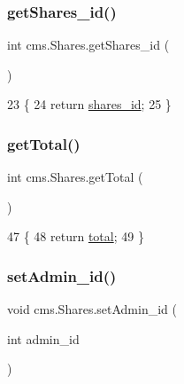 \subsubsection{\texorpdfstring{get\+Shares\+\_\+id()}{getShares\_id()}}
{\footnotesize\ttfamily int cms.\+Shares.\+get\+Shares\+\_\+id (\begin{DoxyParamCaption}{ }\end{DoxyParamCaption})\hspace{0.3cm}{\ttfamily [inline]}}


\begin{DoxyCode}
23                               \{
24         \textcolor{keywordflow}{return} \mbox{\hyperlink{classcms_1_1_shares_a15e43f7e31f2c147893fc92c4a94037a}{shares\_id}};
25     \}
\end{DoxyCode}
\mbox{\label{classcms_1_1_shares_a7c570e186e607ad6e777d7882259e91f}} 
\subsubsection{\texorpdfstring{get\+Total()}{getTotal()}}
{\footnotesize\ttfamily int cms.\+Shares.\+get\+Total (\begin{DoxyParamCaption}{ }\end{DoxyParamCaption})\hspace{0.3cm}{\ttfamily [inline]}}


\begin{DoxyCode}
47                           \{
48         \textcolor{keywordflow}{return} \mbox{\hyperlink{classcms_1_1_shares_ab40a204e3f87bf0f315888a9040a8681}{total}};
49     \}
\end{DoxyCode}
\mbox{\label{classcms_1_1_shares_a8f025b1fab555ab66ebfee36ffd7e918}} 
\subsubsection{\texorpdfstring{set\+Admin\+\_\+id()}{setAdmin\_id()}}
{\footnotesize\ttfamily void cms.\+Shares.\+set\+Admin\+\_\+id (\begin{DoxyParamCaption}\item[{int}]{admin\+\_\+id }\end{DoxyParamCaption})\hspace{0.3cm}{\ttfamily [inline]}}


